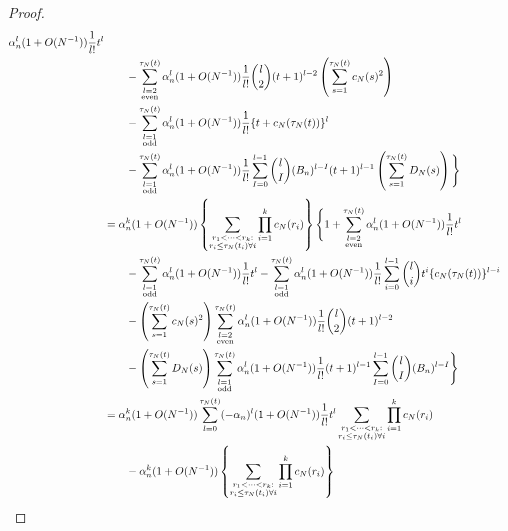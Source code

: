 \documentclass{article}
\newcommand{\1}[1]{\mathbbm{1}_{#1}}
\begin{document}
\begin{proof}
\begin{align}
\alpha_n^l (1 + O(N^{-1}) ) \frac{1}{l!} t^l \notag\\
&\qquad- \sum_{\substack{ l=2 \\ \text{even} }}^{\tau_N(t)}
\alpha_n^l (1 + O(N^{-1}) ) \frac{1}{l!} \binom{l}{2} (t+1)^{l-2}
\left( \sum_{s=1}^{\tau_N(t)} c_N(s)^2 \right) \notag\\
&\qquad- \sum_{\substack{ l=1 \\ \text{odd} }}^{\tau_N(t)}
\alpha_n^l (1 + O(N^{-1}) ) \frac{1}{l!}
\{ t + c_N(\tau_N(t)) \}^l \notag\\
&\qquad- \sum_{\substack{ l=1 \\ \text{odd} }}^{\tau_N(t)}
\alpha_n^l (1 + O(N^{-1}) ) \frac{1}{l!}
\sum_{I=0}^{l-1} \binom{l}{I} (B_n)^{l-I} (t+1)^{l-1}
\left( \sum_{s=1}^{\tau_N(t)} D_N(s) \right) \Bigg\} \notag\\
&= \alpha_n^k (1 + O(N^{-1}) )
\left\{ \sum_{\substack{r_1 <\dots< r_k :\\ r_i \leq \tau_N(t_i) \forall i}} \prod_{i=1}^k c_N(r_i) \right\}
\Bigg\{ 1 
+ \sum_{\substack{ l=2 \\ \text{even} }}^{\tau_N(t)} \alpha_n^l (1 + O(N^{-1}) ) \frac{1}{l!} t^l \notag\\
&\qquad- \sum_{\substack{ l=1 \\ \text{odd} }}^{\tau_N(t)} \alpha_n^l (1 + O(N^{-1}) ) \frac{1}{l!} t^l 
- \sum_{\substack{ l=1 \\ \text{odd} }}^{\tau_N(t)} \alpha_n^l (1 + O(N^{-1}) ) \frac{1}{l!}
\sum_{i=0}^{l-1} \binom{l}{i} t^i \{ c_N(\tau_N(t)) \}^{l-i} \notag\\
&\qquad- \left( \sum_{s=1}^{\tau_N(t)} c_N(s)^2 \right)
\sum_{\substack{ l=2 \\ \text{even} }}^{\tau_N(t)} \alpha_n^l (1 + O(N^{-1}) )
\frac{1}{l!} \binom{l}{2} (t+1)^{l-2} \notag\\
&\qquad- \left( \sum_{s=1}^{\tau_N(t)} D_N(s) \right)
\sum_{\substack{ l=1 \\ \text{odd} }}^{\tau_N(t)} \alpha_n^l (1 + O(N^{-1}) )\frac{1}{l!} (t+1)^{l-1}
\sum_{I=0}^{l-1} \binom{l}{I} (B_n)^{l-I} \Bigg\} \notag\\
&= \alpha_n^k (1 + O(N^{-1}) )
\sum_{l=0}^{\tau_N(t)} (- \alpha_n)^l (1 + O(N^{-1}) ) \frac{1}{l!} t^l 
\sum_{\substack{r_1 <\dots< r_k :\\ r_i \leq \tau_N(t_i) \forall i}} \prod_{i=1}^k c_N(r_i) \notag\\
&\qquad- \alpha_n^k (1 + O(N^{-1}) )
\left\{ \sum_{\substack{r_1 <\dots< r_k :\\ r_i \leq \tau_N(t_i) \forall i}} \prod_{i=1}^k c_N(r_i) \right\}

\end{align}
\end{proof}
\end{document}
